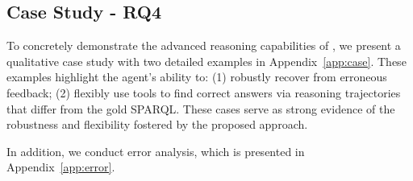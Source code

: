\subsection{Case Study - RQ4}

To concretely demonstrate the advanced reasoning capabilities of \ours, we present a qualitative case study with two detailed examples in Appendix~\ref{app:case}. These examples highlight the agent's ability to: (1) robustly recover from erroneous feedback; (2) flexibly use tools to find correct answers via reasoning trajectories that differ from the gold SPARQL. These cases serve as strong evidence of the robustness and flexibility fostered by the proposed \ours\space approach.

In addition, we conduct error analysis, which is presented in Appendix~\ref{app:error}.











